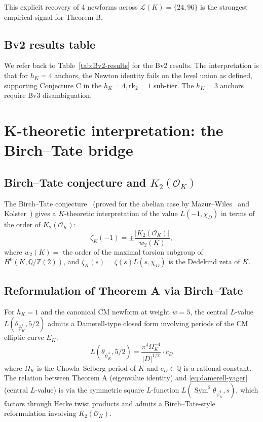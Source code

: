 \documentclass[11pt,a4paper]{amsart}
\theoremstyle{definition}
\DeclareMathOperator{\Sym}{Sym}
\newcommand{\Q}{\mathbb{Q}}
\newcommand{\Z}{\mathbb{Z}}
\newcommand{\OK}{\mathcal{O}_K}
\newcommand{\Lcal}{\mathcal{L}}
\newcommand{\hK}{h_{K}}
\begin{document}
This explicit recovery of 4 newforms across $\Lcal(K) = \{24, 96\}$ is the strongest empirical signal for Theorem B.

\subsection{Bv2 results table}\label{sec:pari-Bv2}

We refer back to Table~\ref{tab:Bv2-results} for the Bv2 results. The interpretation is that for $\hK = 4$ anchors, the Newton identity fails on the level union as defined, supporting Conjecture C in the $\hK = 4, \mathrm{rk}_2 = 1$ sub-tier. The $\hK = 3$ anchors require Bv3 disambiguation.


\section{K-theoretic interpretation: the Birch--Tate bridge}\label{sec:Ktheory}

\subsection{Birch--Tate conjecture and $K_2(\OK)$}\label{sec:birch-tate}

The Birch--Tate conjecture~\cite{BirchTate1973} (proved for the abelian case by Mazur--Wiles~\cite{MazurWiles1984} and Kolster~\cite{Kolster1989}) gives a $K$-theoretic interpretation of the value $L(-1, \chi_D)$ in terms of the order of $K_2(\OK)$:
\begin{equation}\label{eq:birch-tate}
\zeta_K(-1) = \pm \frac{|K_2(\OK)|}{w_2(K)},
\end{equation}
where $w_2(K) = $ the order of the maximal torsion subgroup of $H^0(K, \Q/\Z(2))$, and $\zeta_K(s) = \zeta(s) L(s, \chi_D)$ is the Dedekind zeta of $K$.

\subsection{Reformulation of Theorem A via Birch--Tate}\label{sec:birch-tate-reform}

For $\hK = 1$ and the canonical CM newform at weight $w = 5$, the central $L$-value $L(\theta_{\bar\psi_K^4}, 5/2)$ admits a Damerell-type closed form involving periods of the CM elliptic curve $E_K$:
\begin{equation}\label{eq:damerell-yager}
L(\theta_{\bar\psi_K^4}, 5/2) = \frac{\pi^4 \Omega_K^{-4}}{|D|^{1/2}} \cdot c_D
\end{equation}
where $\Omega_K$ is the Chowla--Selberg period of $K$ and $c_D \in \Q$ is a rational constant. The relation between Theorem A (eigenvalue identity) and \eqref{eq:damerell-yager} (central $L$-value) is via the symmetric square $L$-function $L(\Sym^2 \theta_{\bar\psi_K^4}, s)$, which factors through Hecke twist products and admits a Birch--Tate-style reformulation involving $K_2(\OK)$.
\end{document}
